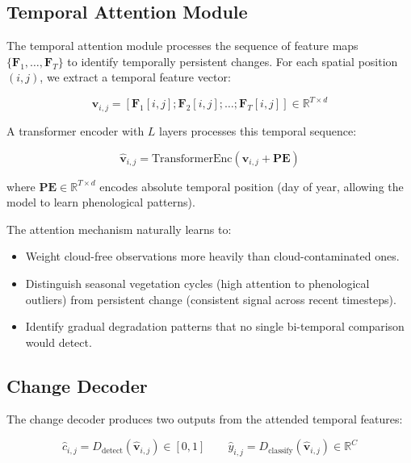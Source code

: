 \subsection{Temporal Attention Module}

The temporal attention module processes the sequence of feature maps $\{\mathbf{F}_1, \ldots, \mathbf{F}_T\}$ to identify temporally persistent changes.
For each spatial position $(i, j)$, we extract a temporal feature vector:

\begin{equation}
    \mathbf{v}_{i,j} = [\mathbf{F}_1[i,j]; \mathbf{F}_2[i,j]; \ldots; \mathbf{F}_T[i,j]] \in \mathbb{R}^{T \times d}
\end{equation}

A transformer encoder with $L$ layers processes this temporal sequence:

\begin{equation}
    \hat{\mathbf{v}}_{i,j} = \text{TransformerEnc}(\mathbf{v}_{i,j} + \mathbf{PE})
\end{equation}

\noindent where $\mathbf{PE} \in \mathbb{R}^{T \times d}$ encodes absolute temporal position (day of year, allowing the model to learn phenological patterns).

The attention mechanism naturally learns to:
\begin{itemize}[leftmargin=*]
    \item Weight cloud-free observations more heavily than cloud-contaminated ones.
    \item Distinguish seasonal vegetation cycles (high attention to phenological outliers) from persistent change (consistent signal across recent timesteps).
    \item Identify gradual degradation patterns that no single bi-temporal comparison would detect.
\end{itemize}

\subsection{Change Decoder}

The change decoder produces two outputs from the attended temporal features:

\begin{equation}
    \hat{c}_{i,j} = D_{\text{detect}}(\hat{\mathbf{v}}_{i,j}) \in [0, 1] \qquad \hat{y}_{i,j} = D_{\text{classify}}(\hat{\mathbf{v}}_{i,j}) \in \mathbb{R}^{C}
\end{equation}

